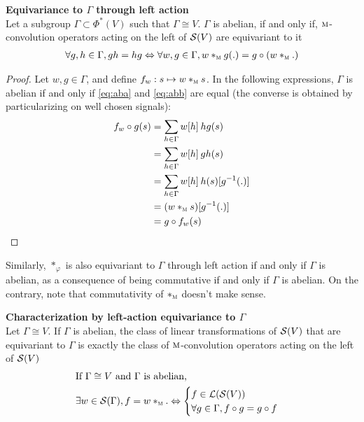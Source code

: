 \begin{proposition}\textbf{Equivariance to $\Gamma$ through left action}\\
Let a subgroup $\Gamma \subset \Phi^*(V)$ such that $\Gamma \cong V$. $\Gamma$ is abelian, if and only if, $\M$-convolution operators acting on the left of $\cs(V)$ are equivariant to it \ie
\begin{gather*}
\forall g,h \in \Gamma, gh = hg \Leftrightarrow \forall w, g \in \Gamma, w \ast_{\M} g(.) = g \circ (w \ast_{\M} .) 
\end{gather*}
\end{proposition}

\begin{proof}

Let $w, g \in \Gamma$, and define $f_w: s \mapsto w \ast_{\M} s$. In the following expressions, $\Gamma$ is abelian if and only if \eqref{eq:aba} and \eqref{eq:abb} are equal (the converse is obtained by particularizing on well chosen signals):
\begin{align}
f_w \circ g (s) & = \displaystyle \sum_{h \in \Gamma} w[h] \h{2} hg(s) \label{eq:aba}\\
 & = \displaystyle \sum_{h \in \Gamma} w[h] \h{2} gh(s) \label{eq:abb}\\
 & = \displaystyle \sum_{h \in \Gamma} w[h] \h{2} h(s)[g^{-1}(.)] \nn\\
 & = (w \ast_{\M} s )[g^{-1}(.)] \nn\\
 & = g \circ f_w (s) \nn
\end{align}
\end{proof}

\begin{remark}Similarly, $\ast_{\varphi}$ is also equivariant to $\Gamma$ through left action if and only if $\Gamma$ is abelian, as a consequence of being commutative if and only if $\Gamma$ is abelian. On the contrary, note that commutativity of $\ast_{\M}$ doesn't make sense.
\end{remark}

\begin{theorem}\textbf{Characterization by left-action equivariance to $\Gamma$}\\
Let $\Gamma \cong V$. If $\Gamma$ is abelian, the class of linear transformations of $\cs(V)$ that are equivariant to $\Gamma$ is exactly the class of $\M$-convolution operators acting on the left of $\cs(V)$ \ie
\begin{align*}
& \text{If } \Gamma \cong V \text{ and $\Gamma$ is abelian,}\\
& \exists w \in \cs(\Gamma), f = w \ast_{\M} . \Leftrightarrow
\begin{cases}
f \in \cl(\cs(V))\\
\forall g \in \Gamma, f \circ g = g \circ f
\end{cases}
\end{align*}
\label{cor:equiM}
\end{theorem}

